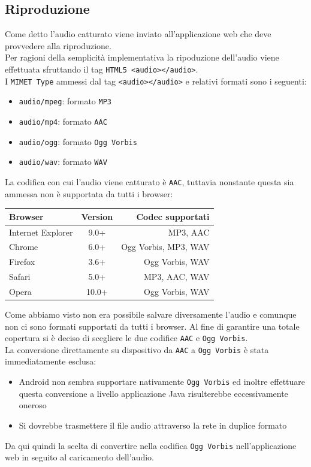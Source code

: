 \subsection{Riproduzione}
Come detto l'audio catturato viene inviato all'applicazione web che deve provvedere alla riproduzione.\\
Per ragioni della semplicità implementativa la ripoduzione dell'audio viene effettuata sfruttando il tag \texttt{HTML5 <audio></audio>}.\\
I \texttt{MIMET Type} ammessi dal tag \texttt{<audio></audio>} e relativi formati sono i seguenti:

\begin{itemize}
	\item \texttt{audio/mpeg}: formato \texttt{MP3}
	\item \texttt{audio/mp4}: formato \texttt{AAC}
	\item \texttt{audio/ogg}: formato \texttt{Ogg Vorbis}
	\item \texttt{audio/wav}: formato \texttt{WAV}
\end{itemize}

La codifica con cui l'audio viene catturato è \texttt{AAC}, tuttavia nonstante questa sia ammessa non è supportata da tutti i browser:

\begin{center}
\begin{tabular}{ l c r }
\textbf{Browser} & \textbf{Version} & \textbf{Codec supportati} \\
\toprule
Internet Explorer &	9.0+ & MP3, AAC \\
\midrule
Chrome & 6.0+ & Ogg Vorbis, MP3, WAV \\
\midrule
Firefox & 3.6+ & Ogg Vorbis, WAV \\
\midrule
Safari & 5.0+ & MP3, AAC, WAV \\
\midrule
Opera & 10.0+ & Ogg Vorbis, WAV \\
\bottomrule
\end{tabular}
\end{center}

Come abbiamo visto non era possibile salvare diversamente l'audio e comunque non ci sono formati supportati da tutti i browser. Al fine di garantire una totale copertura si è deciso di scegliere le due codifice \texttt{AAC} e \texttt{Ogg Vorbis}.\\

La conversione direttamente su dispositivo da \texttt{AAC} a \texttt{Ogg Vorbis} è stata immediatamente esclusa:
\begin{itemize}
	\item Android non sembra supportare nativamente \texttt{Ogg Vorbis} ed inoltre effettuare questa conversione a livello applicazione Java risulterebbe eccessivamente oneroso
	\item Si dovrebbe trasmettere il file audio attraverso la rete in duplice formato
\end{itemize}
Da qui quindi la scelta di convertire nella codifica \texttt{Ogg Vorbis} nell'applicazione web in seguito al caricamento dell'audio.\\

